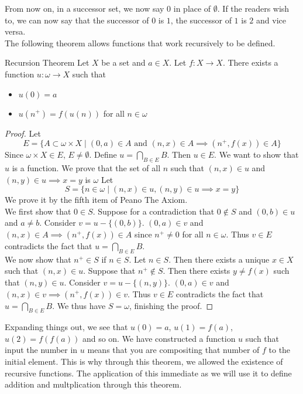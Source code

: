 \documentclass[a4paper]{article}
\begin{document}
From now on, in a successor set, we now say $0$ in place of $\emptyset$. If the readers wish to, we can now say that the successor of $0$ is $1$, the successor of $1$ is $2$ and vice versa. \\

The following theorem allows functions that work recursively to be defined. 

\begin{thm}{Recursion Theorem}{} Let $X$ be a set and $a\in X$. Let $f:X\to X$. There exists a function $u:\omega\to X$ such that
\begin{itemize}
\item $u(0)=a$
\item $u(n^+)=f(u(n))$ for all $n\in\omega$
\end{itemize}
\begin{proof} Let $$E=\{A\subset\omega\times X\;|\;(0,a)\in A\text{ and }(n,x)\in A\implies (n^+,f(x))\in A\}$$ Since $\omega\times X\in E$, $E\neq\emptyset$. Define $u=\bigcap_{B\in E}B$. Then $u\in E$. We want to show that $u$ is a function. We prove that the set of all $n$ such that $(n,x)\in u$ and $(n,y)\in u\implies x=y$ is $\omega$ Let $$S=\{n\in\omega\;|\;(n,x)\in u,(n,y)\in u\implies x=y\}$$ We prove it by the fifth item of Peano The Axiom. \\
We first show that $0\in S$. Suppose for a contradiction that $0\notin S$ and $(0,b)\in u$ and $a\neq b$. Consider $v=u-\{(0,b)\}$. $(0,a)\in v$ and $(n,x)\in A\implies (n^+,f(x))\in A$ since $n^+\neq 0$ for all $n\in\omega$. Thus $v\in E$ contradicts the fact that $u=\bigcap_{B\in E}B$. \\
We now show that $n^+\in S$ if $n\in S$. Let $n\in S$. Then there exists a unique $x\in X$ such that $(n,x)\in u$. Suppose that $n^+\notin S$. Then there exists $y\neq f(x)$ such that $(n,y)\in u$. Consider $v=u-\{(n,y)\}$. $(0,a)\in v$ and $(n,x)\in v\implies (n^+,f(x))\in v$. Thus $v\in E$ contradicts the fact that $u=\bigcap_{B\in E}B$. We thus have $S=\omega$, finishing the proof. 
\end{proof}
\end{thm}

Expanding things out, we see that $u(0)=a$, $u(1)=f(a)$, $u(2)=f(f(a))$ and so on. We have constructed a function $u$ such that input the number in $u$ means that you are compositing that number of $f$ to the initial element. This is why through this theorem, we allowed the existence of recursive functions. The application of this immediate as we will use it to define addition and multplication through this theorem. 
\end{document}
